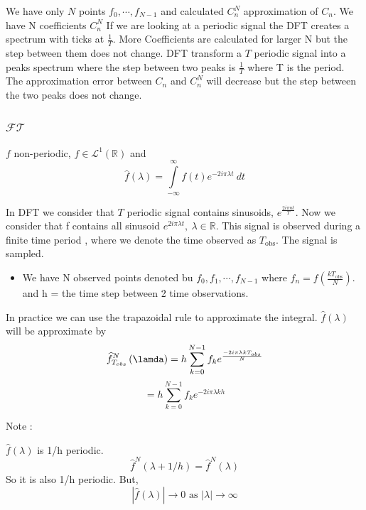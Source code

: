 \begin{enumerate}
We have only $ N $ points $ f_0, \cdots, f _{ N-1 }^{  }  $ and calculated $ C^N_n $
approximation of $ C_n  $. 
We have N coefficients $ C _{ n  }^{ N }  $ 
If we are looking at a periodic signal the DFT creates a spectrum with ticks at $ \frac{ 1
}{ T }  $. More Coefficients are calculated for larger N but the step between them does
not change. DFT transform a $ T $ periodic signal into a peaks spectrum where the step
between two peaks is $ \frac{ 1 }{ T }  $ where T is the period. The approximation error
between $ C_n  $ and $ C _{ n  }^{ N }  $ will decrease but the step between the two peaks
does not change. 

\subsubsection{ $\mathscr{ FT }$ }
$ f $ non-periodic, $ f\in \mathscr{ L } ^1 ( \mathbb{R})  $ and 
\[
    \widehat{f} \left( \lambda \right) = \int\limits_{-\infty}^{\infty}  f(t) e _{  }^{ -2i\pi
    \lambda t } \ dt 
\]

In DFT we consider that $ T $ periodic signal contains sinusoids, $ e _{  }^{ \frac{ 2i\pi
nt }{ T }  }  $. Now we consider that f contains all sinusoid $ e _{  }^{ 2i\pi \lambda t
} ,\ \lambda \in \mathbb{R}$. This signal is observed during a finite time period , where
we denote the time observed as $ T_{\text{obs} } $. The signal is sampled. 
\begin{itemize}
    \item We have N observed points denoted bu $ f_0, f_1, \cdots, f_{N-1}  $ where 
        $ f_n  = f\left( \frac{ kT _{ \text{obs}  }^{  }  }{ N } \right)  $.  and h = the
        time step between 2 time observations. 
\end{itemize}
In practice we can use the trapazoidal rule to approximate the integral. 
$ \widehat{f}\left( \lambda\right)  $ will be approximate by 
\[
    \widehat{f} _{ T_{obs}  }^{ N } \left( \lamda \right) = h \sum_{k=0}^{N-1} f_k e _{
    }^{ \frac{ -2i\pi \lambda k T_{obs}  }{ N }  } 
\]
\[
= h \sum_{k = 0}^{N-1} f_k e _{  }^{ -2i\pi\lambda kh } 
\]

Note : 
\begin{ftheo}
    $ \widehat{f} \left( \lambda \right)  $ is 1/h periodic. 
    \[
        \widehat{f}^N\left( \lambda + 1/h \right) = \widehat{f}^N\left( \lambda \right) 
    \]
    So it is also 1/h periodic. 
    But, 
    \[
        \left | \widehat{f}\left( \lambda \right)  \right | \to 0 \text{ as } \left |
        \lambda  \right | \to \infty
    \]
    \label{th:Note a theorem}
\end{ftheo}


\end{enumerate}
